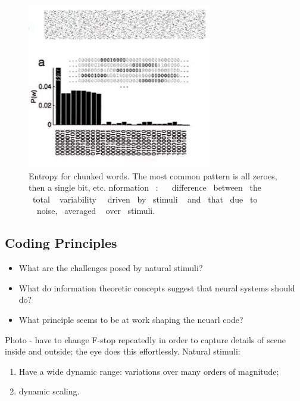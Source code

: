\documentclass[]{article}
\begin{document}
\begin{figure}[H]
	\begin{center}
		\caption[Entropy for chunked words]{Entropy for chunked words. The most common pattern is all zeroes, then a single bit, etc. nformation  :   
			difference  between  the  total  
			variability   driven  by  stimuli  
			and  that  due  to   noise,  averaged  
			over  stimuli. \cite{strong1998entropy,reinagel2000temporal}}
		\includegraphics[width=\textwidth]{info-spike-trains}
	\end{center}
\end{figure}
\subsection{Coding Principles}
\begin{itemize}
	\item What are the challenges posed by natural stimuli?
	\item What do information theoretic concepts suggest that neural systems should do?
	\item What principle seems to be at work shaping the neuarl code?
\end{itemize}

Photo - have to change F-stop repeatedly in order to capture details of scene inside and outside; the eye does this effortlessly. Natural stimuli:
\begin{enumerate}
	\item Have a wide dynamic range: variations over many orders of magnitude;
	\item dynamic scaling.
\end{enumerate}
\end{document}
